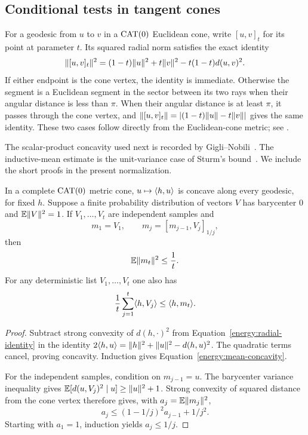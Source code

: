 \subsection{Conditional tests in tangent cones}

For a geodesic from $u$ to $v$ in a $\operatorname{CAT}(0)$ Euclidean cone, write
$[u,v]_t$ for its point at parameter $t$.  Its squared
radial norm satisfies the exact identity
\begin{equation}\label{energy:radial-identity}
 \lVert [u,v]_t\rVert^2
 =(1-t)\lVert u\rVert^2+t\lVert v\rVert^2-t(1-t)d(u,v)^2.
\end{equation}
If either endpoint is the cone vertex, the identity is immediate.
Otherwise the segment is a Euclidean segment in the sector between
its two rays when their angular distance is less than $\pi$.  When
their angular distance is at least $\pi$, it passes through the cone vertex, and
$\lVert [u,v]_t\rVert=|(1-t)\lVert u\rVert-t\lVert v\rVert|$ gives the same identity.
These two cases follow directly from the Euclidean-cone metric;
see \cite[Definition~I.5.6 and Proposition~I.5.10(1)--(2)]{BH1999}.

The scalar-product concavity used next is recorded by
Gigli--Nobili~\cite[Proposition~2.6, equation~(2.7f), and the proof of
Proposition~3.8]{GigliNobili2021}. The inductive-mean estimate is the
unit-variance case of Sturm's bound~\cite[Definition~4.6 and
Theorem~4.7, proof~\textup{(a)}]{Sturm2003}. We include the short proofs in the present
normalization.

\begin{lemma}\label{energy:cone-mean}
In a complete $\operatorname{CAT}(0)$ metric cone, $u\mapsto\langle h,u\rangle$ is concave
along every geodesic, for fixed $h$.  Suppose a finite probability
distribution of vectors $V$ has barycenter $0$ and
$\mathbb E\lVert V\rVert^2=1$.  If $V_1,\ldots,V_t$ are independent samples
and
\[
 m_1=V_1,\qquad
 m_j=[m_{j-1},V_j]_{1/j},
\]
then
\begin{equation}\label{energy:inductive-mean}
 \mathbb E\lVert m_t\rVert^2\le\frac1t.
\end{equation}
For any deterministic list $V_1,\ldots,V_t$ one also has
\begin{equation}\label{energy:mean-concavity}
 \frac1t\sum_{j=1}^t\langle h,V_j\rangle\le\langle h,m_t\rangle.
\end{equation}
\end{lemma}

\begin{proof}
Subtract strong convexity of $d(h,\cdot)^2$ from
Equation~\eqref{energy:radial-identity} in the identity
$2\langle h,u\rangle=\lVert h\rVert^2+\lVert u\rVert^2-d(h,u)^2$.  The quadratic terms
cancel, proving concavity.  Induction gives
Equation~\eqref{energy:mean-concavity}.

For the independent samples, condition on $m_{j-1}=u$.
The barycenter variance inequality gives
$\mathbb E[d(u,V_j)^2\mid u]\ge\lVert u\rVert^2+1$.  Strong convexity
of squared distance from the cone vertex therefore gives, with
$a_j=\mathbb E\lVert m_j\rVert^2$,
\[
 a_j\le(1-1/j)^2a_{j-1}+1/j^2.
\]
Starting with $a_1=1$, induction yields $a_j\le1/j$.
\end{proof}

